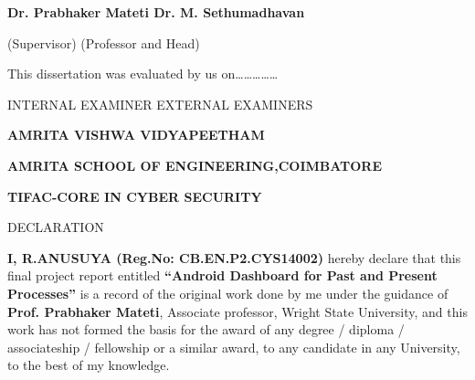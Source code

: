 \documentclass[12pt]{report}
\begin{document}
\vspace*{52pt}
\begin{flushleft}
	\noindent
	\textbf{Dr. Prabhaker Mateti \hspace*{165pt}Dr. M. Sethumadhavan}
	
	\vspace*{5pt}
	\noindent
	\hspace*{35pt}(Supervisor)
	\hspace*{212pt}
	(Professor and Head)
\end{flushleft}



\vspace*{20pt}
\begin{flushleft}
	\noindent
	This dissertation was evaluated by us on\ldots\ldots\ldots\ldots\ldots
\end{flushleft}

\vspace*{52pt}
\begin{flushleft}
	\noindent
	INTERNAL EXAMINER \hspace*{150pt} EXTERNAL EXAMINERS
\end{flushleft}

\clearpage




\begin{center}
	\large
	\textbf{AMRITA VISHWA VIDYAPEETHAM}
	
	\normalsize
	\textbf{AMRITA SCHOOL OF ENGINEERING,COIMBATORE}
	
	\textbf{TIFAC-CORE IN CYBER SECURITY}
	
	\vspace*{42pt}
	\normalsize
	DECLARATION
	
\end{center}

\vspace*{32pt}


\begin{sloppypar}
	\noindent
	\textbf{I, R.ANUSUYA (Reg.No: CB.EN.P2.CYS14002)} hereby declare that this final project report entitled \textbf{``Android Dashboard for Past and Present Processes''} is a record of the original work done by me under the guidance of \textbf{Prof. Prabhaker Mateti}, Associate professor, Wright State University, and this work has not formed the basis for the award of any degree / diploma / associateship / fellowship or a similar award, to any candidate in any University, to the best of my knowledge.
\end{sloppypar}
\end{document}
